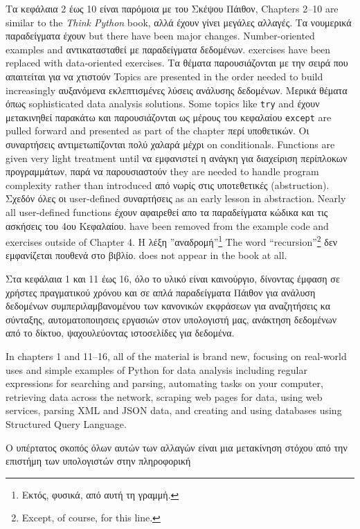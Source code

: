 Τα κεφάλαια 2 έως 10 είναι παρόμοια με του Σκέψου Πάιθον,
Chapters 2--10 are similar to the \emph{Think Python} book,
αλλά έχουν γίνει μεγάλες αλλαγές. Τα νουμερικά παραδείγματα έχουν 
but there have been major changes. Number-oriented examples and
αντικατασταθεί με παραδείγματα δεδομένων. 
exercises have been replaced with data-oriented exercises.
Τα θέματα παρουσιάζονται με την σειρά που απαιτείται για να χτιστούν 
Topics are presented in the order needed to build increasingly
αυξανόμενα εκλεπτισμένες λύσεις ανάλυσης δεδομένων. Μερικά θέματα όπως 
sophisticated data analysis solutions. Some topics like {\tt try} and
έχουν μετακινηθεί παρακάτω και παρουσιάζονται ως μέρους του κεφαλαίου 
{\tt except} are pulled forward and presented as part of the chapter
περί υποθετικών. Οι συναρτήσεις αντιμετωπίζονται πολύ χαλαρά μέχρι 
on conditionals.  Functions are given very light treatment until 
να εμφανιστεί η ανάγκη για διαχείριση περίπλοκων προγραμμάτων, παρά να παρουσιαστούν
they are needed to handle program complexity rather than introduced 
από νωρίς στις υποτεθετικές (abstruction). Σχεδόν όλες οι user-defined συναρτήσεις 
as an early lesson in abstraction.  Nearly all user-defined functions
έχουν αφαιρεθεί απο τα παραδείγματα κώδικα και τις ασκήσεις του 4ου Κεφαλαίου.
have been removed from the example code and exercises outside of Chapter 4.
Η λέξη ''αναδρομή''\footnote{Εκτός, φυσικά, από αυτή τη γραμμή.}
The word ``recursion''\footnote{Except, of course, for this line.}
δεν εμφανίζεται πουθενά στο βιβλίο.
does not appear in the book at all.

Στα κεφάλαια 1 και 11 έως 16, όλο το υλικό είναι καινούργιο, δίνοντας έμφαση 
σε χρήστες πραγματικού χρόνου και σε απλά παραδείγματα Πάιθον για ανάλυση δεδομένων
συμπεριλαμβανομένου των κανονικών εκφράσεων για αναζητήσεις κα σύνταξης,
αυτοματοποιησεις εργασιών στον υπολογιστή μας, ανάκτηση δεδομένων από το δίκτυο,
ψαχουλεύοντας ιστοσελίδες για δεδομένα.

In chapters 1 and 11--16, all of the material is brand new, focusing
on real-world uses and simple examples of Python for data analysis 
including regular expressions for searching and parsing, 
automating tasks on your computer, retrieving data across 
the network, scraping web pages for data, 
using web services, parsing XML and JSON data, and creating 
and using databases using Structured Query Language.

Ο υπέρτατος σκοπός όλων αυτών των αλλαγών είναι μια μετακίνηση στόχου από
την επιστήμη των υπολογιστών στην πληροφορική

